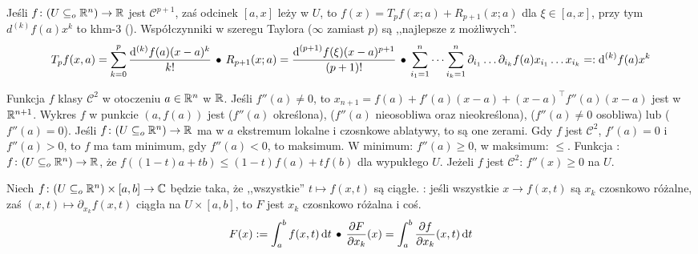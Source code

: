 Jeśli  $f \colon (U \subseteq_o \mathbb{R}^n) \to \mathbb{R}$ jest $\mathscr C^{p+1}$, zaś odcinek $[a, x]$ leży w $U$, to $f(x) = T_pf(x; a) + R_{p+1}(x;a)$ dla $\xi \in [a, x]$, przy tym $d^{(k)} f(a) x^k$ to khm-3 ().
Współczynniki w szeregu Taylora ($\infty$ zamiast $p$) są ,,najlepsze z możliwych''.
\[
	T_pf(x, a) = \sum_{k=0}^p \frac{\textrm{d}{}^{(k)} f(a) (x-a)^k}{k!} \, \bullet \,
	{R_{p+1} (x;a) = \frac{\text{d}^{(p+1)} f(\xi) (x-a)^{p+1}}{(p+1)!}} \, \bullet \,
	\sum_{i_1 = 1}^n \cdots \sum_{i_k=1}^n \partial_{i_1} \ldots \partial_{i_k} f(a) x_{i_1} \ldots x_{i_k} =: \textrm{d}^{(k)} f(a) x^k
\]

Funkcja $f$ klasy $\mathscr C^2$ w otoczeniu  $a \in \mathbb{R}^n$ w $\mathbb{R}$.
Jeśli $f''(a) \neq 0$, to $x_{n+1} = f(a) + f'(a)(x-a) + (x-a)^\top f''(a)(x-a)$ jest  w $\mathbb{R}^{n+1}$.
Wykres $f$ w punkcie $(a, f(a))$ jest  ($f''(a)$ określona),  ($f''(a)$ nieosobliwa oraz nieokreślona),  ($f''(a) \neq 0$ osobliwa) lub  ($f''(a) = 0$).
Jeśli $f\colon (U \subseteq_o \mathbb{R}^n) \to \mathbb{R}$ ma w $a$ ekstremum lokalne i czosnkowe ablatywy, to są one zerami.
Gdy $f$ jest $\mathscr C^2$, $f'(a) = 0$ i $f''(a) > 0$, to $f$ ma tam minimum, gdy $f''(a) < 0$, to maksimum.
W minimum: $f''(a) \ge 0$, w maksimum: $\le$.
Funkcja : $f \colon (U \subseteq_o \mathbb{R}^n) \to \mathbb{R}$, że  $f((1-t)a + tb) \le (1-t) f(a) + t f(b)$ dla wypukłego $U$.
Jeżeli $f$ jest $\mathscr C^2$: $f''(x) \ge 0$ na $U$.

Niech  $f \colon (U \subseteq_o \mathbb{R}^n) \times [a,b] \to \mathbb{C}$ będzie taka, że ,,wszystkie'' $t \mapsto f(x,t)$ są ciągłe.
: jeśli wszystkie $x \to f(x,t)$ są $x_k$ czosnkowo różalne, zaś $(x,t) \mapsto \partial_{x_k} f(x,t)$ ciągła na $U \times [a,b]$, to $F$ jest $x_k$ czosnkowo różalna i coś.
\[
	F(x) := \int_a^b f(x,t) \,\textrm{d}{t} \, \bullet \,
	\frac{\partial F}{\partial x_k} (x) = \int_a^b \frac{\partial f}{\partial x_k} (x,t) \,\textrm{d}{t}
\]

